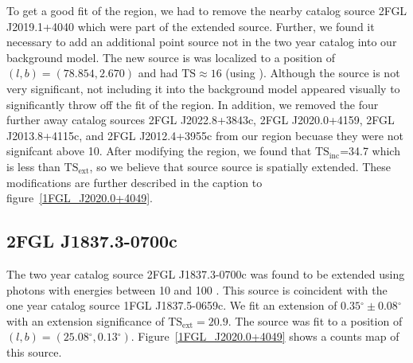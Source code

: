 \documentclass[12pt,preprint]{aastex}
\newcommand{\gev}{\text{GeV}\xspace}
\newcommand{\tsext}{{\ensuremath{\text{TS}_\text{ext}}}\xspace}
\newcommand{\tsinc}{\ensuremath{\text{TS}_\text{inc}}\xspace}
\newcommand{\ts}{\text{TS}\xspace}
\renewcommand{\deg}{\ensuremath{^\circ}\xspace}
\newcommand{\pointlike}{\text{\em pointlike}\xspace}
\begin{document}
To get a good fit of the region, we had to remove the nearby catalog
source 2FGL J2019.1+4040 which were part of the extended source.
Further, we found it necessary to add an additional point source not in
the two year catalog into our background model.  The new source is was
localized to a position of $(l,b)=(78.854,2.670)$ and had $\ts\approx 16$
(using \pointlike).  Although the source is not very significant, not
including it into the background model appeared visually to significantly
throw off the fit of the region.  In addition, we removed the four
further away catalog sources 2FGL J2022.8+3843c, 2FGL J2020.0+4159,
2FGL J2013.8+4115c, and 2FGL J2012.4+3955c from our region becuase they
were not signifcant above 10\gev.  After modifying the region, we found
that \tsinc=34.7 which is less than \tsext, so we believe that source
source is spatially extended.  These modifications are further described
in the caption to figure~\ref{1FGL_J2020.0+4049}.


\subsection{2FGL J1837.3-0700c}




The two year catalog source 2FGL J1837.3-0700c was found to be extended
using photons with energies between 10 \gev and 100 \gev. This source
is coincident with the one year catalog source 1FGL J1837.5-0659c. We
fit an extension of $0.35\deg\pm0.08\deg$ with an extension
significance of $\tsext=20.9$.  The source was fit to a position of
$(l,b)=(25.08\deg,0.13\deg)$.  Figure~\ref{1FGL_J2020.0+4049} shows a
counts map of this source.
\end{document}
